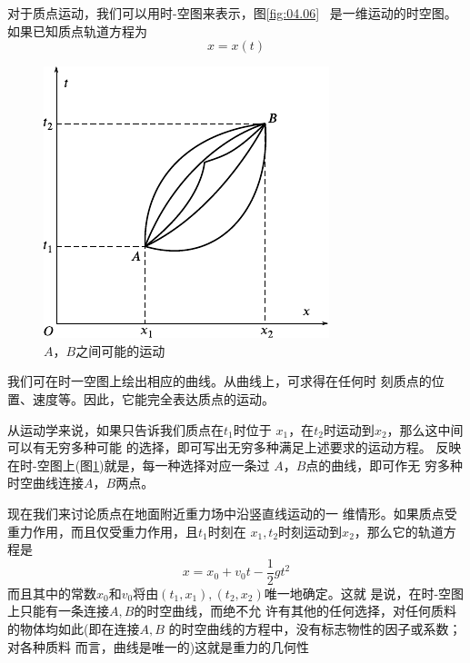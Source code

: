 对于质点运动，我们可以用时-空图来表示，图\ref{fig:04.06}~
是一维运动的时空图。如果已知质点轨道方程为
\begin{equation*}
  x = x \left( t \right)
\end{equation*}
\begin{figure}
  \vspace{-1em}
  \centering
  \includegraphics{figure/fig04.07}
  \caption{$ A $，$ B $之间可能的运动}
  \label{fig:04.07}
\end{figure}
我们可在时一空图上绘出相应的曲线。从曲线上，可求得在任何时
刻质点的位置、速度等。因此，它能完全表达质点的运动。

从运动学来说，如果只告诉我们质点在$ t_1 $时位于
$ x_1 $，在$ t_2 $时运动到$ x_2 $，那么这中间可以有无穷多种可能
的选择，即可写出无穷多种满足上述要求的运动方程。
反映在时-空图上(图\ref{fig:04.07})就是，每一种选择对应一条过
$ A $，$ B $点的曲线，即可作无
穷多种时空曲线连接$ A $，$ B $两点。

现在我们来讨论质点在地面附近重力场中沿竖直线运动的一
维情形。如果质点受重力作用，而且仅受重力作用，且$  t _ { 1 }   $时刻在
$ x _ { 1 }   ,  t _ { 2 }   $时刻运动到$  x _ { 2 }   $，那么它的轨道方程是
\begin{equation*}
  x = x _ { 0 } + v _ { 0 } t - \frac { 1 } { 2 } g t ^ { 2 }
\end{equation*}
而且其中的常数$ x _ { 0 } $和$  v _ { 0 }  $将由$  \left( t _ { 1 }, x _ { 1 } \right)   ,  \left( t _ { 2 } , x _ { 2 } \right)   $唯一地确定。这就
是说，在时-空图上只能有一条连接$ A , B $的时空曲线，而绝不允
许有其他的任何选择，对任何质料的物体均如此(即在连接$ A , B $
的时空曲线的方程中，没有标志物性的因子或系数；对各种质料
而言，曲线是唯一的)这就是重力的几何性


